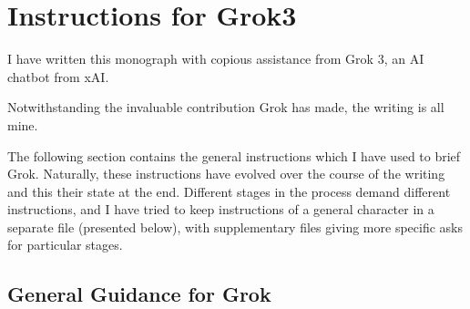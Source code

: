 \documentclass[10pt,titlepage]{book}
\newcommand{\ignore}[1]{}
\newcommand{\resetnotes}{%
  \ifnum\value{endnote}>0%
  \theendnotes%
  \setcounter{endnote}{0}%
  \else%
  \fi%
}
\begin{document}
\appendix

\ignore{
\chapter{The Philosophy of Rudolf Carnap}\label{PRC}


\resetnotes

}%

\appendix

\chapter{Instructions for Grok3}\label{InstructionsForGrok}

I have written this monograph with copious assistance from Grok 3, an AI chatbot from xAI.

Notwithstanding the invaluable contribution Grok has made, the writing is all mine.

The following section contains the general instructions which I have used to brief Grok.
Naturally, these instructions have evolved over the course of the writing and this their state at the end.
Different stages in the process demand different instructions, and I have tried to keep instructions of a general character  in a separate file (presented below), with supplementary files giving more specific asks for particular stages.

\section{General Guidance for Grok}



\listoftables

{}



\renewcommand{\indexname}{Index of Defined Terms}
{\twocolumn[]
{\small\printindex}}


\end{document}
